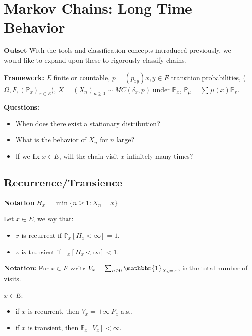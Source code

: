 \chapter{Markov Chains: Long Time Behavior}
\noindent \textbf{Outset} With the tools and classification concepts introduced previously, we would like to expand upon these to rigorously classify chains.

\noindent \textbf{Framework:} $E$ finite or countable, $p=(p_{xy})x,y \in E$ transition probabilities, ($\Omega, F, (\mathbb{P}_x) _{x \in E}$), $X=(X_n)_{n\geq 0} \sim MC(\delta_x,p)$ under $\mathbb{P}_x$, $\mathbb{P}_\mu = \sum_{}^{} \mu (x)\mathbb{P}_x$.

\noindent \textbf{Questions:} 
\begin{itemize}
	\item When does there exist a stationary distribution?
	\item What is the behavior of $X_n$ for $n$ large?
	\item If we fix $x \in E$, will the chain visit $x$ infinitely many times?
\end{itemize}

\section{Recurrence/Transience}

\textbf{Notation} $H_x = \min\{n\geq 1: X_n=x\}$
\begin{defn}
	Let $x \in E$, we say that:
\begin{itemize}
	\item $x$ is recurrent if $\boxed{\mathbb{P}_{x} \left[ H_x<\infty \right]=1 }$.
	\item $x$ is transient if $\boxed{\mathbb{P}_{x} \left[ H_x<\infty \right] <1}$.
\end{itemize}

\end{defn}
\noindent
\textbf{Notation:} For $x \in E$ write $V_x=\sum_{n\geq 0}^{} \mathbbm{1}_{X_n=x} $, ie the total number of visits.

\begin{theorem}
	$x \in E$:
\begin{itemize}
	\item if $x$ is recurrent, then $\boxed{V_{x}=+\infty} \ P_x$-a.s..
	\item if $x$ is transient, then $\boxed{\mathbb{E}_{x} \left[ V_x \right] <\infty}$.
\end{itemize}
\end{theorem}

